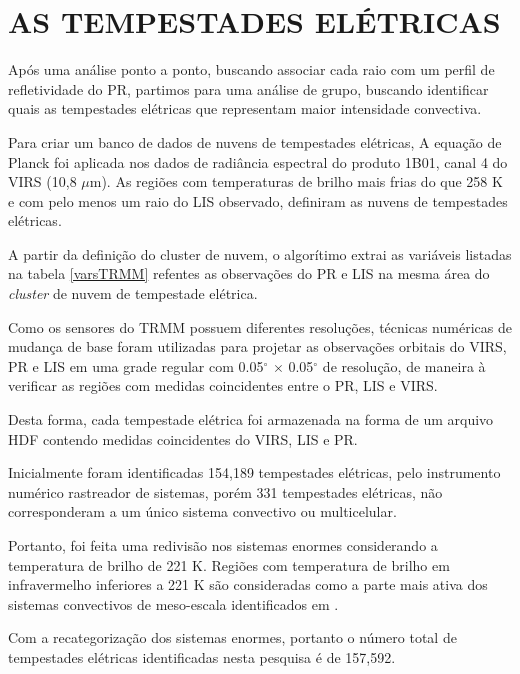 \section{AS TEMPESTADES ELÉTRICAS}

Após uma análise ponto a ponto, buscando associar cada raio com um perfil de refletividade do PR, partimos para uma análise de grupo, buscando identificar quais as tempestades elétricas que representam maior intensidade convectiva.

Para criar um banco de dados de nuvens de tempestades elétricas, A equação de Planck foi aplicada nos dados de radiância espectral do produto 1B01, canal 4 do VIRS (10,8 $\mu$m). As regiões com temperaturas de brilho mais frias do que 258 K e com pelo menos um raio do LIS observado, definiram as nuvens de tempestades elétricas.


A partir da definição do cluster de nuvem, o algorítimo extrai as variáveis listadas na tabela \ref{varsTRMM} refentes as observações do PR e LIS na mesma área do \textit{cluster} de nuvem de tempestade elétrica.

Como os sensores do TRMM possuem diferentes resoluções, técnicas numéricas de mudança de base foram utilizadas para projetar as observações orbitais do VIRS, PR e LIS em uma grade regular com 0.05$^{\circ}$ $\times$ 0.05$^{\circ}$ de resolução, de maneira à verificar as regiões com medidas coincidentes entre o PR, LIS e VIRS.


Desta forma, cada tempestade elétrica foi armazenada na forma de um arquivo HDF contendo medidas coincidentes do VIRS, LIS e PR. 

Inicialmente foram identificadas 154,189 tempestades elétricas, pelo instrumento numérico rastreador de sistemas, porém 331 tempestades elétricas, não corresponderam a um único sistema convectivo ou multicelular. 

Portanto, foi feita uma redivisão nos sistemas enormes considerando a temperatura de brilho de 221 K. Regiões com temperatura de brilho em infravermelho inferiores a 221 K são consideradas como a parte mais ativa dos sistemas convectivos de meso-escala identificados em . 

Com a recategorização dos sistemas enormes, portanto o número total de tempestades elétricas identificadas nesta pesquisa é de 157,592.


